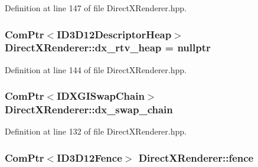 Definition at line 147 of file Direct\+X\+Renderer.\+hpp.

\subsubsection[{\texorpdfstring{dx\+\_\+rtv\+\_\+heap}{dx_rtv_heap}}]{\setlength{\rightskip}{0pt plus 5cm}Com\+Ptr$<$I\+D3\+D12\+Descriptor\+Heap$>$ Direct\+X\+Renderer\+::dx\+\_\+rtv\+\_\+heap = nullptr\hspace{0.3cm}{\ttfamily [protected]}}\hypertarget{class_direct_x_renderer_a082c69eafb2449e5f19efb156fa0c0e8_a082c69eafb2449e5f19efb156fa0c0e8}{}\label{class_direct_x_renderer_a082c69eafb2449e5f19efb156fa0c0e8_a082c69eafb2449e5f19efb156fa0c0e8}


Definition at line 144 of file Direct\+X\+Renderer.\+hpp.

\subsubsection[{\texorpdfstring{dx\+\_\+swap\+\_\+chain}{dx_swap_chain}}]{\setlength{\rightskip}{0pt plus 5cm}Com\+Ptr$<$I\+D\+X\+G\+I\+Swap\+Chain$>$ Direct\+X\+Renderer\+::dx\+\_\+swap\+\_\+chain\hspace{0.3cm}{\ttfamily [protected]}}\hypertarget{class_direct_x_renderer_adb032dd1c2a1add393fe9f6e73770e68_adb032dd1c2a1add393fe9f6e73770e68}{}\label{class_direct_x_renderer_adb032dd1c2a1add393fe9f6e73770e68_adb032dd1c2a1add393fe9f6e73770e68}


Definition at line 132 of file Direct\+X\+Renderer.\+hpp.

\subsubsection[{\texorpdfstring{fence}{fence}}]{\setlength{\rightskip}{0pt plus 5cm}Com\+Ptr$<$I\+D3\+D12\+Fence$>$ Direct\+X\+Renderer\+::fence\hspace{0.3cm}{\ttfamily [protected]}}\hypertarget{class_direct_x_renderer_a9f2cdba34c8670e6ec1f686b362ab700_a9f2cdba34c8670e6ec1f686b362ab700}{}\label{class_direct_x_renderer_a9f2cdba34c8670e6ec1f686b362ab700_a9f2cdba34c8670e6ec1f686b362ab700}


